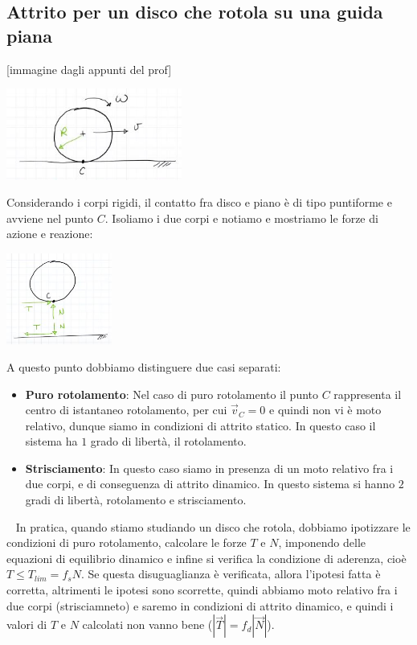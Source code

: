 \subsection{Attrito per un disco che rotola su una guida piana}
[immagine dagli appunti del prof]
\begin{center}
    \includegraphics[height=3cm]{../lezione11/img8.JPG}
\end{center}
Considerando i corpi rigidi, il contatto fra disco e piano è di tipo puntiforme e avviene nel punto $C$. Isoliamo i due corpi e notiamo e mostriamo le forze di azione e reazione:
\begin{center}
    \includegraphics[height=3cm]{../lezione11/img9.JPG}
\end{center}
A questo punto dobbiamo distinguere due casi separati:
\begin{itemize}
    \item \textbf{Puro rotolamento}: Nel caso di puro rotolamento il punto $C$ rappresenta il centro di istantaneo rotolamento, per cui $\vec{v}_C = 0$ e quindi non vi è moto relativo, dunque siamo in condizioni di attrito statico. In questo caso il sistema ha $1$ grado di libertà, il rotolamento.
    \item \textbf{Strisciamento}: In questo caso siamo in presenza di un moto relativo fra i due corpi, e di conseguenza di attrito dinamico. In questo sistema si hanno $2$ gradi di libertà, rotolamento e strisciamento.
\end{itemize}
\ \newline
In pratica, quando stiamo studiando un disco che rotola, dobbiamo ipotizzare le condizioni di puro rotolamento, calcolare le forze $T$ e $N$, imponendo delle equazioni di equilibrio dinamico e infine si verifica la condizione di aderenza, cioè $T \leq T_{lim} = f_s N$. Se questa disuguaglianza è verificata, allora l'ipotesi fatta è corretta, altrimenti le ipotesi sono scorrette, quindi abbiamo moto relativo fra i due corpi (strisciamneto) e saremo in condizioni di attrito dinamico, e quindi i valori di $T$ e $N$ calcolati non vanno bene ($|\vec{T}| = f_d |\vec{N}|$).\newline
